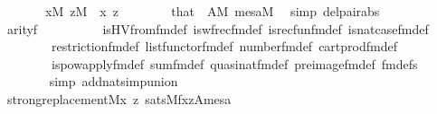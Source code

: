 \begin{isabellebody}
\ \ \ \ \ \ \ {\isachardoublequoteopen}x{\isasymin}M{\isachardoublequoteclose}\ {\isachardoublequoteopen}z{\isasymin}M{\isachardoublequoteclose}\ \ x\ z\isanewline
\ \ \ \ \ \ \isamarkupfalse%
\ that\ {}\ {\isacartoucheopen}A{\isasymin}M{\isacartoucheclose}\ {\isacartoucheopen}mesa{\isasymin}M{\isacartoucheclose}\ \isamarkupfalse%
\ {\isacharparenleft}{\kern0pt}simp\ del{\isacharcolon}{\kern0pt}pair{\isacharunderscore}{\kern0pt}abs{\isacharparenright}{\kern0pt}\isanewline
\ \ \ \ \isamarkupfalse%
\ {\isachardoublequoteopen}arity{\isacharparenleft}{\kern0pt}{\isacharquery}{\kern0pt}f{\isacharparenright}{\kern0pt}\ {\isacharequal}{\kern0pt}\ {}{\isachardoublequoteclose}\isanewline
\ \ \ \ \ \ \isamarkupfalse%
\ is{\isacharunderscore}{\kern0pt}HVfrom{\isacharunderscore}{\kern0pt}fm{\isacharunderscore}{\kern0pt}def\ is{\isacharunderscore}{\kern0pt}wfrec{\isacharunderscore}{\kern0pt}fm{\isacharunderscore}{\kern0pt}def\ is{\isacharunderscore}{\kern0pt}recfun{\isacharunderscore}{\kern0pt}fm{\isacharunderscore}{\kern0pt}def\ is{\isacharunderscore}{\kern0pt}nat{\isacharunderscore}{\kern0pt}case{\isacharunderscore}{\kern0pt}fm{\isacharunderscore}{\kern0pt}def\isanewline
\ \ \ \ \ \ \ \ restriction{\isacharunderscore}{\kern0pt}fm{\isacharunderscore}{\kern0pt}def\ list{\isacharunderscore}{\kern0pt}functor{\isacharunderscore}{\kern0pt}fm{\isacharunderscore}{\kern0pt}def\ number{}{\isacharunderscore}{\kern0pt}fm{\isacharunderscore}{\kern0pt}def\ cartprod{\isacharunderscore}{\kern0pt}fm{\isacharunderscore}{\kern0pt}def\isanewline
\ \ \ \ \ \ \ \ is{\isacharunderscore}{\kern0pt}powapply{\isacharunderscore}{\kern0pt}fm{\isacharunderscore}{\kern0pt}def\ sum{\isacharunderscore}{\kern0pt}fm{\isacharunderscore}{\kern0pt}def\ quasinat{\isacharunderscore}{\kern0pt}fm{\isacharunderscore}{\kern0pt}def\ pre{\isacharunderscore}{\kern0pt}image{\isacharunderscore}{\kern0pt}fm{\isacharunderscore}{\kern0pt}def\ fm{\isacharunderscore}{\kern0pt}defs\isanewline
\ \ \ \ \ \ \isamarkupfalse%
\ {\isacharparenleft}{\kern0pt}simp\ add{\isacharcolon}{\kern0pt}nat{\isacharunderscore}{\kern0pt}simp{\isacharunderscore}{\kern0pt}union{\isacharparenright}{\kern0pt}\isanewline
\ \ \ \ \isamarkupfalse%
\isanewline
\ \ \ \ \isamarkupfalse%
\ {\isachardoublequoteopen}strong{\isacharunderscore}{\kern0pt}replacement{\isacharparenleft}{\kern0pt}{\isacharhash}{\kern0pt}{\isacharhash}{\kern0pt}M{\isacharcomma}{\kern0pt}{\isasymlambda}x\ z{\isachardot}{\kern0pt}\ sats{\isacharparenleft}{\kern0pt}M{\isacharcomma}{\kern0pt}{\isacharquery}{\kern0pt}f{\isacharcomma}{\kern0pt}{\isacharbrackleft}{\kern0pt}x{\isacharcomma}{\kern0pt}z{\isacharcomma}{\kern0pt}A{\isacharcomma}{\kern0pt}mesa{\isacharbrackright}{\kern0pt}{\isacharparenright}{\kern0pt}{\isacharparenright}{\kern0pt}{\isachardoublequoteclose}\isanewline

\end{isabellebody}
